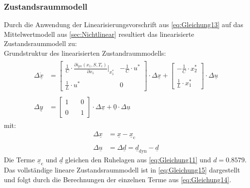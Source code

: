 \subsubsection{Zustandsraummodell}
\label{sec:Zustandsraummodell}
Durch die Anwendung der Linearisierungsvorschrift aus \autoref{eq:Gleichung13} auf das Mittelwertmodell aus \autoref{sec:Nichtlinear} resultiert das linearisierte Zustandsraummodell zu:\\
Grundstruktur des linearisierten Zustandraummodells:
\begin{align}
    \begin{split}
    \Delta\underline{\dot{x}} &= 
    \begin{bmatrix}
        \frac{1}{C}\cdot\frac{\partial i_{\mathrm{pv}}(x_{\mathrm{1}}, S, T_{\mathrm{c}})}{\partial x_{\mathrm{1}}}\big |_{x_{\mathrm{1}}^*} & -\frac{1}{C}\cdot u^* \\\\
        \frac{1}{L}\cdot u^* & 0
    \end{bmatrix} \cdot \Delta \underline{x} +
    \begin{bmatrix}
        -\frac{1}{C}\cdot x_{\mathrm{2}}^* \\\\
        \frac{1}{L}\cdot x_{\mathrm{1}}^*
    \end{bmatrix} \cdot
    \Delta \underline{u}
     \\\\
    \Delta \underline{y} &= 
    \begin{bmatrix}
        1 & \quad 0 \\\\
        0 & \quad 1
    \end{bmatrix} \cdot \Delta \underline{x} + \underline{0} \cdot \Delta\underline{u}
    \end{split}
    \label{eq:Gleichung14}
\end{align}
\newline
mit:
\begin{align*}
    \Delta \underline{x} &= \underline{x} - \underline{x}_{\mathrm{c}} \\\\
    \Delta \underline{u} &= \Delta \underline{d} = \underline{d}_{\mathrm{dyn}}-\underline{d}
\end{align*}
\newline
Die Terme $\underline{x}_{\mathrm{c}}$ und $\underline{d}$ gleichen den Ruhelagen aus \autoref{eq:Gleichung11} und $d = 0.8579$. Das vollständige lineare Zustandsraummodell ist in \autoref{eq:Gleichung15} dargestellt und folgt durch die Berechnungen der einzelnen Terme aus \autoref{eq:Gleichung14}.\\
